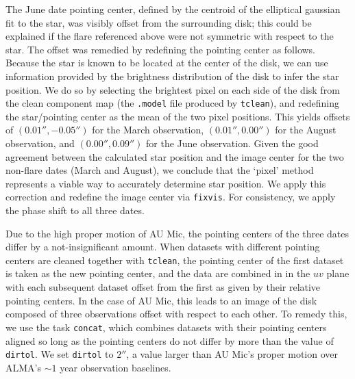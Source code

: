 \documentclass[12pt,modern,oneside]{book}
\begin{document}
The June date pointing center, defined by the centroid of the elliptical
gaussian fit to the star, was visibly offset from the surrounding disk; this
could be explained if the flare referenced above were not symmetric with respect
to the star. The offset was remedied by redefining the pointing center as
follows. Because the star is known to be located at the center of the disk, we
can use information provided by the brightness distribution of the disk to infer
the star position. We do so by selecting the brightest pixel on each side of the
disk from the clean component map (the \texttt{.model} file produced by
\texttt{tclean}), and redefining the star/pointing center as the mean of the two
pixel positions. This yields offsets of $(0.01'', -0.05'')$ for the March
observation, $(0.01'', 0.00'')$ for the August observation, and $(0.00'',
0.09'')$ for the June observation. Given the good agreement between the
calculated star position and the image center for the two non-flare dates (March
and August), we conclude that the `pixel' method represents a viable way to
accurately determine star position. We apply this correction and redefine the
image center via \texttt{fixvis}. For consistency, we apply the phase shift to
all three dates.

Due to the high proper motion of AU Mic, the pointing centers of the three dates
differ by a not-insignificant amount. When datasets with different pointing
centers are cleaned together with \texttt{tclean}, the pointing center of the
first dataset is taken as the new pointing center, and the data are combined in
in the $uv$ plane with each subsequent dataset offset from the first as given by
their relative pointing centers. In the case of AU Mic, this leads to an  image
of the disk composed of three observations offset with respect to each other. To
remedy this, we use the task \texttt{concat}, which combines datasets with their
pointing centers aligned so long as the pointing centers do not differ by more
than the value of \texttt{dirtol}. We set \texttt{dirtol} to $ 2''$, a value
larger than  AU Mic's proper motion over ALMA's $\sim 1$ year observation
baselines.



% 
% 
\end{document}
